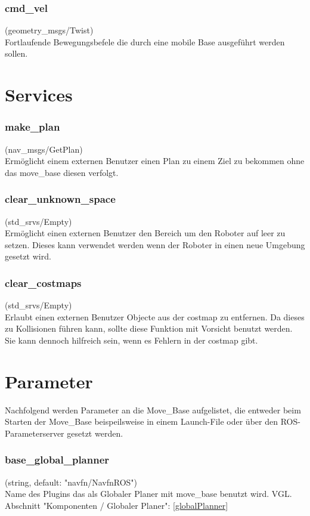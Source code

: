 \documentclass[oribibl]{llncs}
\begin{document}
\subsubsection{cmd\_vel} (geometry\_msgs/Twist)\\
	Fortlaufende Bewegungsbefele die durch eine mobile Base ausgeführt werden sollen.
	
\section{Services}
\subsubsection{make\_plan} (nav\_msgs/GetPlan)\\
	Ermöglicht einem externen Benutzer einen Plan zu einem Ziel zu bekommen ohne 	das move\_base diesen verfolgt.
\subsubsection{clear\_unknown\_space} (std\_srvs/Empty)\\
	Ermöglicht einen externen Benutzer den Bereich um den Roboter auf leer zu setzen. 	Dieses kann verwendet werden wenn der Roboter in einen neue Umgebung gesetzt 	wird.
\subsubsection{clear\_costmaps} (std\_srvs/Empty)\\
	Erlaubt einen externen Benutzer Objecte aus der costmap zu entfernen. Da dieses 	zu Kollisionen führen kann, sollte diese Funktion mit Vorsicht benutzt werden. Sie 	kann dennoch hilfreich sein, wenn es Fehlern in der costmap gibt.
	
\section{Parameter}
Nachfolgend werden Parameter an die Move\_Base aufgelistet, die entweder beim Starten der Move\_Base beispeilsweise in einem Launch-File oder über den ROS-Parameterserver gesetzt werden.
\subsubsection{base\_global\_planner} (string, default: "navfn/NavfnROS")\\
   Name des Plugins das als Globaler Planer mit move\_base benutzt wird. VGL. Abschnitt "Komponenten / Globaler Planer": \ref{globalPlanner}
\end{document}
